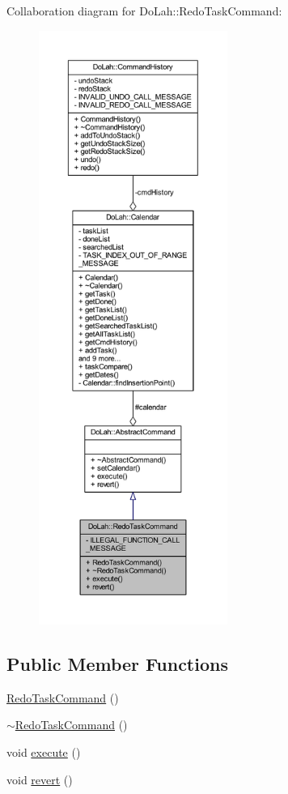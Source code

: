 Collaboration diagram for Do\+Lah\+:\+:Redo\+Task\+Command\+:\nopagebreak
\begin{figure}[H]
\begin{center}
\leavevmode
\includegraphics[height=550pt]{class_do_lah_1_1_redo_task_command__coll__graph}
\end{center}
\end{figure}
\subsection*{Public Member Functions}
\begin{DoxyCompactItemize}
\item 
\hyperlink{class_do_lah_1_1_redo_task_command_a8213fc02f43fce7edc83e68a98154ec0}{Redo\+Task\+Command} ()
\item 
\hyperlink{class_do_lah_1_1_redo_task_command_a62f51fafdaf80d090718ae8c3469150a}{$\sim$\+Redo\+Task\+Command} ()
\item 
void \hyperlink{class_do_lah_1_1_redo_task_command_ac800b1815e384bbef9b1aff35a0f5fe2}{execute} ()
\item 
void \hyperlink{class_do_lah_1_1_redo_task_command_ad37e7e810f33597506b4347ed4945f3b}{revert} ()
\end{DoxyCompactItemize}
